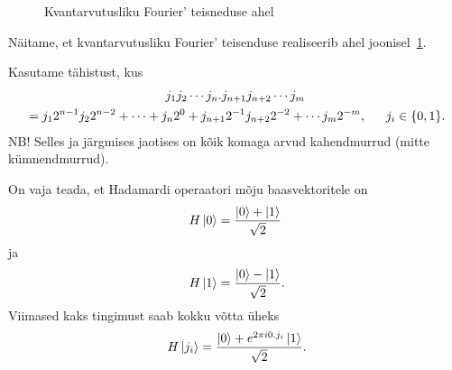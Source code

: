 \documentclass[12pt]{report}
\def\ket#1{\mathinner{|#1\rangle}}
\begin{document}
\begin{figure}
    \centering
    \caption{Kvantarvutusliku Fourier' teisneduse ahel~\cite{nielsen+chuang, kaye+laflamme+mosca}}
    \label{fig:qft}
\end{figure}

Näitame, et kvantarvutusliku Fourier' teisenduse realiseerib ahel joonisel~\ref{fig:qft}.

Kasutame tähistust, kus
\begin{multline}
    j_1j_2\cdots j_n.j_{n+1}j_{n+2}\cdots j_m \\
    = j_1 2^{n-1} j_2 2^{n-2} + \cdots + j_n 2^0 + j_{n+1} 2^{-1} j_{n+2} 2^{-2} + \cdots j_m 2^{-m} \rlap{,}
    \qquad j_i \in \{0, 1\} \rlap{.}
\end{multline}
NB! Selles ja järgmises jaotises on kõik komaga arvud kahendmurrud (mitte kümnendmurrud).

On vaja teada, et Hadamardi operaatori mõju baasvektoritele on
\begin{align}
    H\ket{0} = \frac{\ket{0} + \ket{1}}{\sqrt{2}}
\end{align}
ja
\begin{align}
    H\ket{1} = \frac{\ket{0} - \ket{1}}{\sqrt{2}} \rlap{.}
\end{align}
Viimased kaks tingimust saab kokku võtta üheks
\begin{align}
    H\ket{j_i} = \frac{\ket{0} + e^{2\pi i0.j_i}\ket{1}}{\sqrt{2}}\rlap{.}
\end{align}
\end{document}
